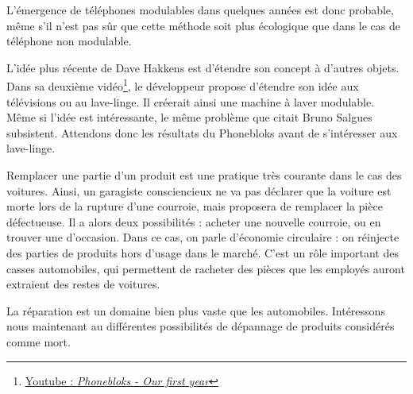 \medbreak 

L'émergence de téléphones modulables dans quelques années est donc probable, même s'il n'est pas sûr que cette méthode soit plus écologique que dans le cas de téléphone non modulable. 

L'idée plus récente de Dave Hakkens est d'étendre son concept à d'autres objets. Dans sa deuxième vidéo\footnote{\href{https://www.youtube.com/watch?v=4KmewIC-eV4}{Youtube : \textit{Phonebloks - Our first year}}}, le développeur propose d'étendre son idée aux télévisions ou au lave-linge. Il créerait ainsi une machine à laver modulable. Même si l'idée est intéressante, le même problème que citait Bruno Salgues subsistent. Attendons donc les résultats du Phonebloks avant de s'intéresser aux lave-linge. 

\bigbreak

Remplacer une partie d'un produit est une pratique très courante dans le cas des voitures. 
Ainsi, un garagiste consciencieux ne va pas déclarer que la voiture est morte lors de la rupture d'une courroie, mais proposera de remplacer la pièce défectueuse. Il a alors deux possibilités : acheter une nouvelle courroie, ou en trouver une d'occasion. Dans ce cas, on parle d'économie circulaire : on réinjecte des parties de produits hors d'usage dans le marché. C'est un rôle important des casses automobiles, qui permettent de racheter des pièces que les employés auront extraient des restes de voitures. 

La réparation est un domaine bien plus vaste que les automobiles. Intéressons nous maintenant au différentes possibilités de dépannage de produits considérés comme mort. 